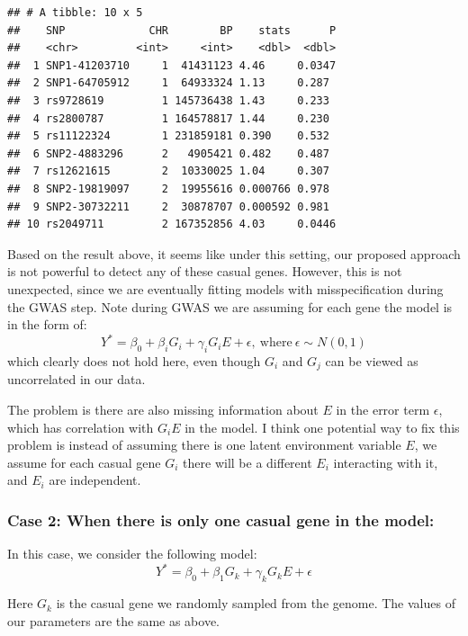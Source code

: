 \documentclass[
]{article}
\begin{document}
\begin{verbatim}
## # A tibble: 10 x 5
##    SNP             CHR        BP    stats      P
##    <chr>         <int>     <int>    <dbl>  <dbl>
##  1 SNP1-41203710     1  41431123 4.46     0.0347
##  2 SNP1-64705912     1  64933324 1.13     0.287 
##  3 rs9728619         1 145736438 1.43     0.233 
##  4 rs2800787         1 164578817 1.44     0.230 
##  5 rs11122324        1 231859181 0.390    0.532 
##  6 SNP2-4883296      2   4905421 0.482    0.487 
##  7 rs12621615        2  10330025 1.04     0.307 
##  8 SNP2-19819097     2  19955616 0.000766 0.978 
##  9 SNP2-30732211     2  30878707 0.000592 0.981 
## 10 rs2049711         2 167352856 4.03     0.0446
\end{verbatim}

Based on the result above, it seems like under this setting, our
proposed approach is not powerful to detect any of these casual genes.
However, this is not unexpected, since we are eventually fitting models
with misspecification during the GWAS step. Note during GWAS we are
assuming for each gene the model is in the form of:
\[Y^* = \beta_0 + \beta_iG_i+ \gamma_iG_iE+\epsilon, \ \text{where} \ \epsilon\sim N(0,1)\]
which clearly does not hold here, even though \(G_i\) and \(G_j\) can be
viewed as uncorrelated in our data.

The problem is there are also missing information about \(E\) in the
error term \(\epsilon\), which has correlation with \(G_iE\) in the
model. I think one potential way to fix this problem is instead of
assuming there is one latent environment variable \(E\), we assume for
each casual gene \(G_i\) there will be a different \(E_i\) interacting
with it, and \(E_i\) are independent.

\hypertarget{case-2-when-there-is-only-one-casual-gene-in-the-model}{%
\subsubsection{Case 2: When there is only one casual gene in the
model:}\label{case-2-when-there-is-only-one-casual-gene-in-the-model}}

In this case, we consider the following model:
\[Y^* = \beta_0 + \beta_1G_k +\gamma_kG_kE + \epsilon\]

Here \(G_k\) is the casual gene we randomly sampled from the genome. The
values of our parameters are the same as above.
\end{document}
